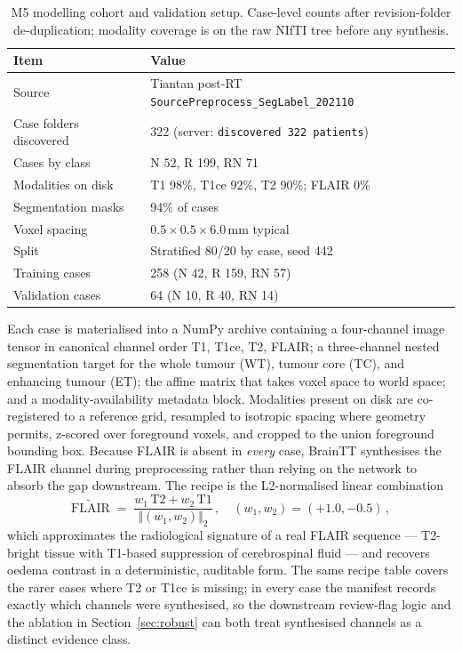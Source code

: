 \documentclass[11pt,a4paper]{article}
\begin{document}
\begin{table}[t]
\centering
\caption{M5 modelling cohort and validation setup. Case-level counts after revision-folder de-duplication; modality coverage is on the raw NIfTI tree before any synthesis.}
\label{tab:m5data}
\small
\begin{tabular}{ll}
\toprule
Item & Value \\
\midrule
Source & Tiantan post-RT \texttt{SourcePreprocess\_SegLabel\_202110} \\
Case folders discovered & 322 (server: \texttt{discovered 322 patients}) \\
Cases by class & N 52, R 199, RN 71 \\
Modalities on disk & T1 98\%, T1ce 92\%, T2 90\%; FLAIR 0\% \\
Segmentation masks & 94\% of cases \\
Voxel spacing & $0.5\times 0.5\times 6.0$\,mm typical \\
Split & Stratified 80/20 by case, seed 442 \\
Training cases & 258 (N 42, R 159, RN 57) \\
Validation cases & 64 (N 10, R 40, RN 14) \\
\bottomrule
\end{tabular}
\end{table}

Each case is materialised into a NumPy archive containing a four-channel image tensor in canonical channel order T1, T1ce, T2, FLAIR; a three-channel nested segmentation target for the whole tumour (WT), tumour core (TC), and enhancing tumour (ET); the affine matrix that takes voxel space to world space; and a modality-availability metadata block. Modalities present on disk are co-registered to a reference grid, resampled to isotropic spacing where geometry permits, z-scored over foreground voxels, and cropped to the union foreground bounding box. Because FLAIR is absent in \emph{every} case, BrainTT synthesises the FLAIR channel during preprocessing rather than relying on the network to absorb the gap downstream. The recipe is the L2-normalised linear combination
\begin{equation}
\widetilde{\text{FLAIR}} \;=\; \frac{w_1\,\text{T2} + w_2\,\text{T1}}{\Vert (w_1,w_2)\Vert_2}\,, \quad (w_1,w_2)=(+1.0,-0.5)\,,
\label{eq:flair}
\end{equation}
which approximates the radiological signature of a real FLAIR sequence --- T2-bright tissue with T1-based suppression of cerebrospinal fluid --- and recovers oedema contrast in a deterministic, auditable form. The same recipe table covers the rarer cases where T2 or T1ce is missing; in every case the manifest records exactly which channels were synthesised, so the downstream review-flag logic and the ablation in Section~\ref{sec:robust} can both treat synthesised channels as a distinct evidence class.
\end{document}
